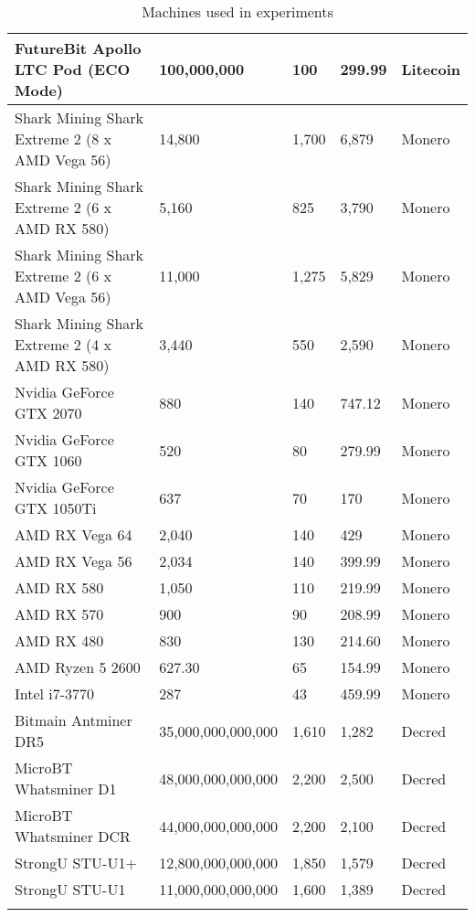 \begin{longtable}{|p{}|p{}|p{}|p{}|p{}|}
  FutureBit Apollo LTC Pod (ECO Mode) & 100,000,000 & 100 & 299.99 & Litecoin \\
  \hline
  Shark Mining Shark Extreme 2 (8 x AMD Vega 56) & 14,800 & 1,700 & 6,879 & Monero \\
  Shark Mining Shark Extreme 2 (6 x AMD RX 580) & 5,160 & 825 & 3,790 & Monero \\
  Shark Mining Shark Extreme 2 (6 x AMD Vega 56) & 11,000 & 1,275 & 5,829 & Monero \\
  Shark Mining Shark Extreme 2 (4 x AMD RX 580) & 3,440 & 550 & 2,590 & Monero \\
  Nvidia GeForce GTX 2070 & 880 & 140 & 747.12 & Monero \\
  Nvidia GeForce GTX 1060 & 520 & 80 & 279.99 & Monero \\
  Nvidia GeForce GTX 1050Ti & 637 & 70 & 170 & Monero \\
  AMD RX Vega 64 & 2,040 & 140 & 429 & Monero \\
  AMD RX Vega 56 & 2,034 & 140 & 399.99 & Monero \\
  AMD RX 580 & 1,050 & 110 & 219.99 & Monero \\
  AMD RX 570 & 900 & 90 & 208.99 & Monero \\
  AMD RX 480 & 830 & 130 & 214.60 & Monero \\
  AMD Ryzen 5 2600 & 627.30 & 65 & 154.99 & Monero \\
  Intel i7-3770 & 287 & 43 & 459.99 & Monero \\
  \hline
  Bitmain Antminer DR5 & 35,000,000,000,000 & 1,610 & 1,282 & Decred \\
  MicroBT Whatsminer D1 & 48,000,000,000,000 & 2,200 & 2,500 & Decred \\
  MicroBT Whatsminer DCR & 44,000,000,000,000 & 2,200 & 2,100 & Decred \\
  StrongU STU-U1+ & 12,800,000,000,000 & 1,850 & 1,579 & Decred \\
  StrongU STU-U1 & 11,000,000,000,000 & 1,600 & 1,389 & Decred \\
  \hline
\caption{Machines used in experiments}
\label{tbl:machines}
\end{longtable}
